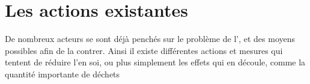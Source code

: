 \section{Les actions existantes}

De nombreux acteurs se sont déjà penchés sur le problème de l'\op , et des moyens possibles afin de la contrer. Ainsi il existe différentes actions et mesures qui tentent de réduire l'\op en soi, ou plus simplement les effets qui en découle, comme la quantité importante de déchets